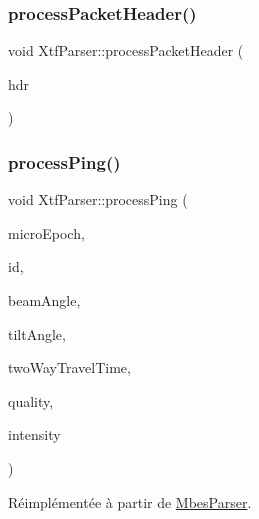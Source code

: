 \mbox{\label{classXtfParser_a7115b43a3325220a4119f1f1c087a83b}} 
\subsubsection{\texorpdfstring{process\+Packet\+Header()}{processPacketHeader()}}
{\footnotesize\ttfamily void Xtf\+Parser\+::process\+Packet\+Header (\begin{DoxyParamCaption}\item[{\hyperlink{structXtfPacketHeader}{Xtf\+Packet\+Header} \&}]{hdr }\end{DoxyParamCaption})\hspace{0.3cm}{\ttfamily [protected]}}

\mbox{\label{classXtfParser_ae8932c52b4030f14acd8b4419037c3eb}} 
\subsubsection{\texorpdfstring{process\+Ping()}{processPing()}}
{\footnotesize\ttfamily void Xtf\+Parser\+::process\+Ping (\begin{DoxyParamCaption}\item[{uint64\+\_\+t}]{micro\+Epoch,  }\item[{long}]{id,  }\item[{double}]{beam\+Angle,  }\item[{double}]{tilt\+Angle,  }\item[{double}]{two\+Way\+Travel\+Time,  }\item[{uint32\+\_\+t}]{quality,  }\item[{uint32\+\_\+t}]{intensity }\end{DoxyParamCaption})\hspace{0.3cm}{\ttfamily [virtual]}}



Réimplémentée à partir de \hyperlink{classMbesParser_a9c099ea1003fff3c99991c37da1d40a6}{Mbes\+Parser}.

\mbox{\label{classXtfParser_a933ceba950e674e638b7d60629883668}} 
